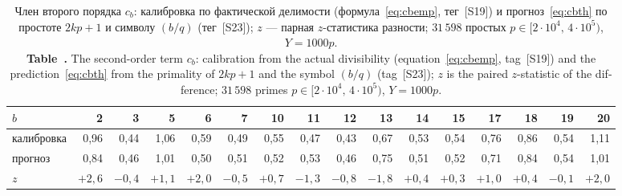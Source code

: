 \documentclass[11pt,a4paper]{article}
\newcommand{\encaptab}[1]{\\[3pt]\foreignlanguage{english}{%
  \textbf{Table~\thetable.} #1}}
\theoremstyle{plain}
\theoremstyle{remark}
\begin{document}
\begin{table}[t]
\centering
\caption{Член второго порядка $c_b$: калибровка по фактической делимости
(формула~\eqref{eq:cbemp}, тег~[S19]) и прогноз~\eqref{eq:cbth} по простоте $2kp+1$ и
символу $(b/q)$ (тег~[S23]); $z$ --- парная $z$-статистика разности; $31\,598$
простых $p\in[2\cdot10^4,\,4\cdot10^5)$, $Y=1000p$.
\encaptab{The second-order term $c_b$: calibration from the actual divisibility
(equation~\eqref{eq:cbemp}, tag~[S19]) and the prediction~\eqref{eq:cbth} from the primality
of $2kp+1$ and the symbol $(b/q)$ (tag~[S23]); $z$ is the paired $z$-statistic of
the difference; $31\,598$ primes $p\in[2\cdot10^4,\,4\cdot10^5)$, $Y=1000p$.}}
\label{tab:cbth}
\small
\setlength{\tabcolsep}{2.6pt}
\begin{tabular}{lrrrrrrrrrrrrrrr}
\toprule
$b$ & 2 & 3 & 5 & 6 & 7 & 10 & 11 & 12 & 13 & 14 & 15 & 17 & 18 & 19 & 20\\
\midrule
калибровка & 0{,}96 & 0{,}44 & 1{,}06 & 0{,}59 & 0{,}49 & 0{,}55 & 0{,}47 & 0{,}43 & 0{,}67 & 0{,}53 & 0{,}54 & 0{,}76 & 0{,}86 & 0{,}54 & 1{,}11\\
прогноз & 0{,}84 & 0{,}46 & 1{,}01 & 0{,}50 & 0{,}51 & 0{,}52 & 0{,}53 & 0{,}46 & 0{,}75 & 0{,}51 & 0{,}52 & 0{,}71 & 0{,}84 & 0{,}54 & 1{,}01\\
$z$ & $+2{,}6$ & $-0{,}4$ & $+1{,}1$ & $+2{,}0$ & $-0{,}5$ & $+0{,}7$ & $-1{,}3$ & $-0{,}8$ & $-1{,}8$ & $+0{,}4$ & $+0{,}3$ & $+1{,}0$ & $+0{,}4$ & $-0{,}1$ & $+2{,}0$\\
\bottomrule
\end{tabular}
\end{table}
\end{document}

